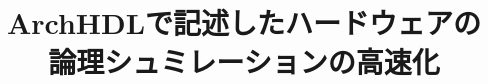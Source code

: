 \usepackage[sc]{mathpazo}
\usepackage[scaled]{helvet}
\usepackage[scaled]{beramono}
\usepackage[deluxe,expert]{otf}
\usepackage{textcomp,okumacro}
\usepackage[bthesis]{archlab}
\graphicspath{{img/}}
\title{ArchHDLで記述したハードウェアの\\ 論理シュミレーションの高速化}

\kougai{}

\setcounter{tocdepth}{3}